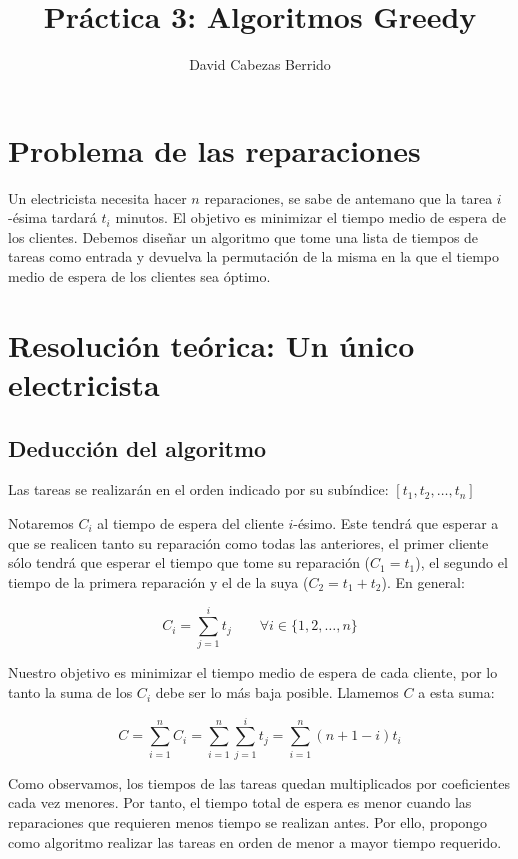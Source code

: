 \documentclass[a4]{article}
\author{David Cabezas Berrido}
\date{\vspace{-5mm}}
\title{\huge Práctica 3: Algoritmos Greedy \HRule\vspace{-4mm}}
\begin{document}
\maketitle
\vspace{20mm}
\tableofcontents
\newpage

\section{Problema de las reparaciones}
Un electricista necesita hacer $n$ reparaciones, se sabe de antemano
que la tarea $i$-ésima tardará $t_i$ minutos. El objetivo es minimizar
el tiempo medio de espera de los clientes. Debemos diseñar un
algoritmo que tome una lista de tiempos de tareas como entrada y
devuelva la permutación de la misma en la que el tiempo medio de
espera de los clientes sea óptimo.

\section{Resolución teórica: Un único electricista}

\subsection{Deducción del algoritmo}

Las tareas se realizarán en el orden indicado por su subíndice:
$[t_1, t_2,\ldots,t_n]$

Notaremos $C_i$ al tiempo de espera del cliente $i$-ésimo. Este tendrá
que esperar a que se realicen tanto su reparación como todas las
anteriores, el primer cliente sólo tendrá que esperar el tiempo que
tome su reparación ($C_1=t_1$), el segundo el tiempo de la primera
reparación y el de la suya ($C_2=t_1+t_2$). En general:

\[C_i=\sum_{j=1}^it_j \qquad \forall i \in \{1,2,\ldots,n\}\]

Nuestro objetivo es minimizar el tiempo medio de espera de cada
cliente, por lo tanto la suma de los $C_i$ debe ser lo más baja
posible. Llamemos $C$ a esta suma:

\[C = \sum_{i=1}^n C_i = \sum_{i=1}^n \sum_{j=1}^i t_j =
  \sum_{i=1}^n(n+1-i)t_i\]

Como observamos, los tiempos de las tareas quedan multiplicados por
coeficientes cada vez menores. Por tanto, el tiempo total de espera es
menor cuando las reparaciones que requieren menos tiempo se realizan
antes. Por ello, propongo como algoritmo realizar las tareas en orden
de menor a mayor tiempo requerido.
\end{document}
